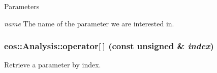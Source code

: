\begin{DoxyParams}{Parameters}
\item[{\em name}]The name of the parameter we are interested in. \end{DoxyParams}
\hypertarget{classeos_1_1Analysis_a963c134ff67911b8a4bc90fc1342e3a3}{
\subsubsection[{operator[]}]{ eos::Analysis::operator\mbox{[}$\,$\mbox{]} (const unsigned \& {\em index})}}
\label{classeos_1_1Analysis_a963c134ff67911b8a4bc90fc1342e3a3}
Retrieve a parameter by index.


